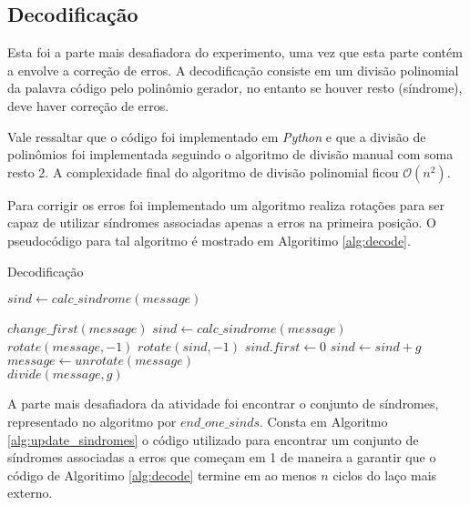 \subsection{Decodificação}

Esta foi a parte mais desafiadora do experimento, uma vez que esta parte contém a envolve a correção de erros. A decodificação consiste em um divisão polinomial da palavra código pelo polinômio gerador, no entanto se houver resto (síndrome), deve haver correção de erros.

Vale ressaltar que o código foi implementado em \textit{Python} e que a divisão de polinômios foi implementada seguindo o algoritmo de divisão manual com soma resto 2. A complexidade final do algoritmo de divisão polinomial ficou $\mathcal{O}(n^2)$.

Para corrigir os erros foi implementado um algoritmo realiza rotações para ser capaz de utilizar síndromes associadas apenas a erros na primeira posição. O pseudocódigo para tal algoritmo é mostrado em Algoritimo \ref{alg:decode}.

\begin{algorithm}
	\caption{Decodificação}\label{alg:decode}
	\begin{algorithmic}[Message]
			\State $sind \gets calc\_sindrome(message)$
			
					\State $change\_first(message)$
					\State $sind \gets calc\_sindrome(message)$
				\Else
				\State $rotate(message, -1)$
				\State $rotate(sind, -1)$
						\State $sind.first \gets 0$
						\State $sind \gets sind+g$
					\EndIf
				\EndIf
			\EndWhile
		\State $message \gets unrotate(message)$\\
		\Return $divide(message, g)$
		\EndProcedure
	\end{algorithmic}
\end{algorithm}

A parte mais desafiadora da atividade foi encontrar o conjunto de síndromes, representado no algoritmo por $end\_one\_sinds$. Consta em Algoritmo \ref{alg:update_sindromes} o código utilizado para encontrar um conjunto de síndromes associadas a erros que começam em 1 de maneira a garantir que o código de Algoritimo \ref{alg:decode} termine em ao menos $n$ ciclos do laço mais externo.


